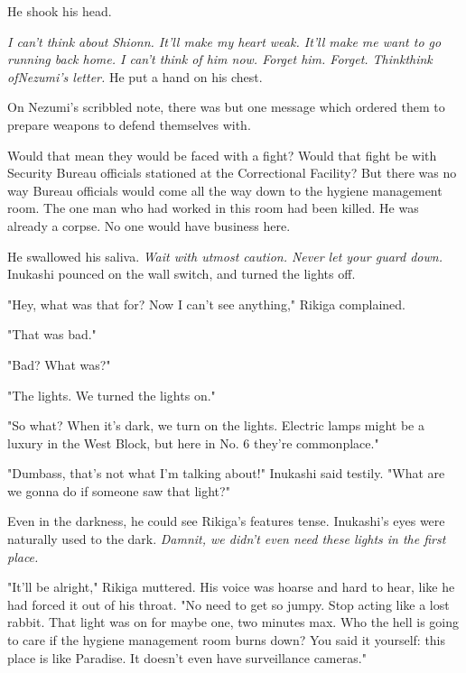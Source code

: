 He shook his head.

\emph{I can't think about Shionn. It'll make my heart weak. It'll make me want
to go running back home. I can't think of him now. Forget him. Forget.
Think\el think of\el Nezumi's letter.} He put a hand on his chest.

On Nezumi's scribbled note, there was but one message which ordered them
to prepare weapons to defend themselves with.


Would that mean they would be faced with a fight? Would that fight be
with Security Bureau officials stationed at the Correctional Facility?
But there was no way Bureau officials would come all the way down to the
hygiene management room. The one man who had worked in this room had
been killed. He was already a corpse. No one would have business here.

He swallowed his saliva. \emph{Wait with utmost caution. Never let your guard
down.} Inukashi pounced on the wall switch, and turned the lights off.

"Hey, what was that for? Now I can't see anything," Rikiga complained.

"That was bad."

"Bad? What was?"

"The lights. We turned the lights on."

"So what? When it's dark, we turn on the lights. Electric lamps might be
a luxury in the West Block, but here in No. 6 they're commonplace."

"Dumbass, that's not what I'm talking about!" Inukashi said testily.
"What are we gonna do if someone saw that light?"

Even in the darkness, he could see Rikiga's features tense. Inukashi's
eyes were naturally used to the dark. \emph{Damnit, we didn't even need these
lights in the first place.}

"It'll be alright," Rikiga muttered. His voice was hoarse and hard to
hear, like he had forced it out of his throat. "No need to get so jumpy.
Stop acting like a lost rabbit. That light was on for maybe one, two
minutes max. Who the hell is going to care if the hygiene management
room burns down? You said it yourself: this place is like Paradise. It
doesn't even have surveillance cameras."

